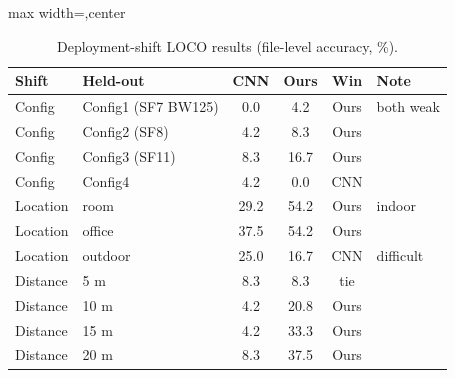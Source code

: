 \begin{table}[!t]
\centering
\caption{Deployment-shift LOCO results (file-level accuracy, \%).}
\label{tab:deployment_shift}
\scriptsize
\setlength{\tabcolsep}{2.1pt}
\renewcommand{\arraystretch}{1.04}
\begin{adjustbox}{max width=\columnwidth,center}
\begin{tabular}{@{}llcccl@{}}
\toprule
Shift & Held-out & CNN & Ours & Win & Note \\
\midrule
Config & Config1 (SF7 BW125) & 0.0 & 4.2 & Ours & both weak \\
Config & Config2 (SF8) & 4.2 & 8.3 & Ours & \\
Config & Config3 (SF11) & 8.3 & 16.7 & Ours & \\
Config & Config4 & 4.2 & 0.0 & CNN & \\
Location & room & 29.2 & 54.2 & Ours & indoor \\
Location & office & 37.5 & 54.2 & Ours & \\
Location & outdoor & 25.0 & 16.7 & CNN & difficult \\
Distance & 5 m & 8.3 & 8.3 & tie & \\
Distance & 10 m & 4.2 & 20.8 & Ours & \\
Distance & 15 m & 4.2 & 33.3 & Ours & \\
Distance & 20 m & 8.3 & 37.5 & Ours & \\
\bottomrule
\end{tabular}
\end{adjustbox}
\end{table}
